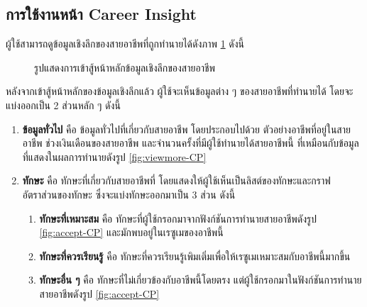 \subsection{การใช้งานหน้า Career Insight}
ผู้ใช้สามารถดูข้อมูลเชิงลึกของสายอาชีพที่ถูกทำนายได้ดังภาพ \ref{fig:home-CI} ดังนี้
\begin{figure}[H]\centering
    \caption{รูปแสดงการเข้าสู้หน้าหลักข้อมูลเชิงลึกของสายอาชีพ}\label{fig:home-CI}
\end{figure}
หลังจากเข้าสู้หน้าหลักของข้อมูลเชิงลึกแล้ว ผู้ใช้จะเห็นข้อมูลต่าง ๆ ของสายอาชีพที่ทำนายได้ โดยจะแบ่งออกเป็น 2 ส่วนหลัก ๆ ดังนี้ 
\begin{enumerate}
    \item \textbf{ข้อมูลทั่วไป} คือ ข้อมูลทั่วไปที่เกี่ยวกับสายอาชีพ โดยประกอบไปด้วย ตัวอย่างอาชีพที่อยู่ในสายอาชีพ ช่วงเงินเดือนของสายอาชีพ และจำนวนครั้งที่มีผู้ใช้ทำนายได้สายอาชีพนี้ ที่เหมือนกับข้อมูลที่แสดงในผลการทำนายดังรูป \ref{fig:viewmore-CP}
    \item \textbf{ทักษะ} คือ ทักษะที่เกี่ยวกับสายอาชีพที่ โดยแสดงให้ผู้ใช้เห็นเป็นลิสต์ของทักษะและกราฟอัตราส่วนของทักษะ ซึ่งจะแบ่งทักษะออกมาเป็น 3 ส่วน ดังนี้
    \begin{enumerate}
        \item \textbf{ทักษะที่เหมาะสม} คือ ทักษะที่ผู้ใช้กรอกมาจากฟังก์ชันการทำนายสายอาชีพดังรูป \ref{fig:accept-CP} และมักพบอยู่ในเรซูเมของอาชีพนี้
        \item \textbf{ทักษะที่ควรเรียนรู้} คือ ทักษะที่ควรเรียนรู้เพิมเติ่มเพื่อให้เรซูเมเหมาะสมกับอาชีพนี้มากขึ้น
        \item \textbf{ทักษะอื่น ๆ} คือ ทักษะที่ไม่เกี่ยวข้องกับอาชีพนี้โดยตรง แต่ผู้ใช้กรอกมาในฟังก์ชันการทำนายสายอาชีพดังรูป \ref{fig:accept-CP}
    \end{enumerate}
\end{enumerate}
